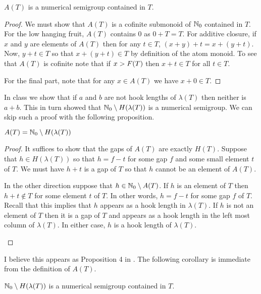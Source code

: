 \begin{proposition}
    \(A(T)\) is a numerical semigroup contained in \(T\).
\end{proposition}
\begin{proof}
    We must show that \(A(T)\) is a cofinite submonoid of \(\mathbb{N}_0\) contained in \(T\). For the low hanging fruit, \(A(T)\) contains \(0\) as \(0 + T = T\). For additive closure, if \(x\) and \(y\) are elements of \(A(T)\) then for any \(t \in T\), \((x + y) + t = x + (y + t)\). Now, \(y + t \in T\) so that \(x + (y + t) \in T\) by definition of the atom monoid. To see that \(A(T)\) is cofinite note that if \(x > F(T)\) then \(x + t \in T\) for all \(t \in T\). 
    
    For the final part, note that for any \(x \in A(T)\) we have \(x + 0 \in T\). 
\end{proof}

In class we show that if \(a\) and \(b\) are not hook lengths of \(\lambda(T)\) then neither is \(a + b\). This in turn showed that \(\mathbb{N}_0 \setminus H(\lambda(T))\) is a numerical semigroup. We can skip such a proof with the following proposition.

\begin{proposition}
    \(A(T) = \mathbb{N}_0 \setminus H(\lambda(T))\)
\end{proposition}
\begin{proof}
    It suffices to show that the gaps of \(A(T)\) are exactly \(H(T)\). Suppose that \(h \in H(\lambda(T))\) so that \(h = f - t\) for some gap \(f\) and some small element \(t\) of \(T\). We must have \(h + t\) is a gap of \(T\) so that \(h\) cannot be an element of \(A(T)\).

    In the other direction suppose that \(h \in \mathbb{N}_0 \setminus A(T)\). If \(h\) is an element of \(T\) then \(h + t \not\in T\) for some element \(t\) of \(T\). In other words, \(h = f - t\) for some gap \(f\) of \(T\). Recall that this implies that \(h\) appears as a hook length in \(\lambda(T)\). If \(h\) is not an element of \(T\) then it is a gap of \(T\) and appears as a hook length in the left most column of \(\lambda(T)\). In either case, \(h\) is a hook length of \(\lambda(T)\).

    \label{proposition:AtomHookset}
\end{proof}

I believe this appears as Proposition 4 in \cite{Constantin2017}. The following corollary is immediate from the definition of \(A(T)\).

\begin{corollary}
    \(\mathbb{N}_0 \setminus H(\lambda(T))\) is a numerical semigroup contained in \(T\).
\end{corollary}

